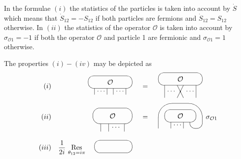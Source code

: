 \documentclass[a4paper,a4paper]{article}
\begin{document}
In the formulae $(i)$ the statistics of the particles is taken into account
by $\dot{S}$ which means that $\dot{S}_{12}=-S_{12}$ if both particles are
fermions and $\dot{S}_{12}=S_{12}$ otherwise. In $(ii)$ the statistics of
the operator $\mathcal{O}$ is taken into account by $\sigma _{\mathcal{O}%
1}=-1$ if both the operator $\mathcal{O}$ and particle 1 are fermionic and $%
\sigma _{\mathcal{O}1}=1$ otherwise.

The properties $(i)-(iv)$ may be depicted as 
\[
\begin{array}{rrcl}
(i) & 
\begin{array}{c}
\unitlength3.2mm\begin{picture}(7,3) \put(3.5,2){\oval(7,2)}
\put(3.5,2){\makebox(0,0){${\cal O}$}} \put(1,0){\line(0,1){1}}
\put(3,0){\line(0,1){1}} \put(4,0){\line(0,1){1}} \put(6,0){\line(0,1){1}}
\put(1.4,.5){$\dots$} \put(4.4,.5){$\dots$} \end{picture}
\end{array}
& = & 
\begin{array}{c}
\unitlength3.2mm\begin{picture}(7,4) \put(3.5,3){\oval(7,2)}
\put(3.5,3){\makebox(0,0){${\cal O}$}} \put(1,0){\line(0,1){2}}
\put(3,0){\line(1,2){1}} \put(4,0){\line(-1,2){1}} \put(6,0){\line(0,1){2}}
\put(1.4,1){$\dots$} \put(4.4,1){$\dots$} \end{picture}
\end{array}
\\ 
(ii) & 
\begin{array}{c}
\unitlength4mm\begin{picture}(5,4) \put(2.5,2){\oval(5,2)}
\put(2.5,2){\makebox(0,0){${\cal O}$}} \put(1,0){\line(0,1){1}}
\put(2,0){\line(0,1){1}} \put(4,0){\line(0,1){1}} \put(2.4,.5){$\dots$}
\end{picture}
\end{array}
& = & 
\begin{array}{c}
\unitlength3.2mm\begin{picture}(7,4) \put(0,0){\line(0,1){1}}
\put(6,1){\oval(2,2)[b]} \put(3.5,1){\oval(7,6)[t]} \put(3.5,2){\oval(5,2)}
\put(3.5,2){\makebox(0,0){${\cal O}$}} \put(2,0){\line(0,1){1}}
\put(4,0){\line(0,1){1}} \put(2.4,.5){$\dots$} \end{picture}
\end{array}
\sigma _{\mathcal{O}1} \\ 
(iii) & \dfrac{1}{2i}\,\mathop{\rm Res}\limits_{\theta _{12}=i\pi }~~ 
\begin{array}{c}
\unitlength3.2mm\begin{picture}(6,4) \put(3,2){\oval(6,2)}

\end{picture}
\end{array}
\end{array}\]
\end{document}
